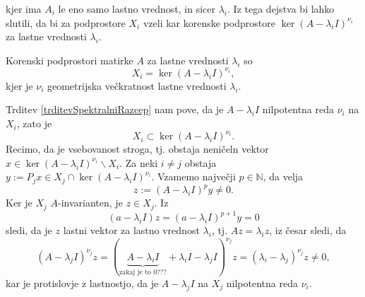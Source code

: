 \documentclass[mat1]{fmfdelo}
\newcommand{\N}{\mathbb N}
\begin{document}
kjer ima $A_i$ le eno samo lastno vrednost, in sicer $\lambda_i$. Iz tega dejstva bi lahko slutili, da bi za podprostore $X_i$ vzeli kar korenske podprostore $\ker (A - \lambda_i I)^{\nu_i}$ za lastne vrednosti $\lambda_i$.
\begin{trditev}
    Korenski podprostori matirke $A$ za lastne vrednosti $\lambda_i$ so
    \begin{equation*}
        X_i = \ker (A - \lambda_i I)^{\nu_i},
    \end{equation*}
    kjer je $\nu_i$ geometrijska večkratnost lastne vrednosti $\lambda_i$.
\end{trditev}
\begin{dokaz}
    Trditev \ref{trditevSpektralniRazcep} nam pove, da je $A - \lambda_i I$ nilpotentna reda $\nu_i$ na $X_i$, zato je
    \begin{equation} \label{strogaVsebovanost}
        X_i \subset \ker (A - \lambda_i I)^{\nu_i}.
    \end{equation}
    Recimo, da je vsebovanost stroga, tj. obstaja neničeln vektor $x \in \ker (A - \lambda_i I)^{\nu_i} \backslash X_i$. Za neki $i \neq j$ obstaja $y := P_j x \in X_j \cap \ker (A - \lambda_i I)^{\nu_i}$. Vzamemo največji $p \in \N$, da velja
    \begin{equation*}
        z := (A - \lambda_i I)^p y \neq 0.
    \end{equation*}
    Ker je $X_j$ $A$-invarianten, je $z \in X_j$. Iz
    \begin{equation*}
        (a - \lambda_i I) z = (a - \lambda_i I)^{p+1} y = 0
    \end{equation*}
    sledi, da je $z$ lastni vektor za lastno vrednost $\lambda_i$, tj. $A z = \lambda_i z$, iz česar sledi, da
    \begin{equation*}
        (A - \lambda_j I)^{\nu_j} z = ( \underbrace{A - \lambda_i I}_\text{zakaj je to 0???} + \lambda_i I - \lambda_j I)^{\nu_j} z = (\lambda_i - \lambda_j)^{\nu_j} z \neq 0,
    \end{equation*}
    kar je protislovje z lastnostjo, da je $A - \lambda_j I$ na $X_j$ nilpotentna reda $\nu_i$.
\end{dokaz}
\end{document}
